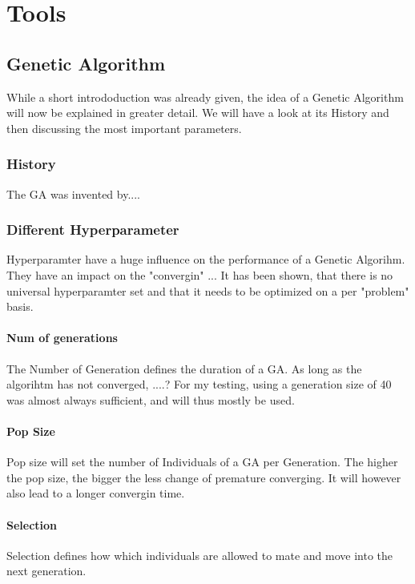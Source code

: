 \chapter{Tools}
\section{Genetic Algorithm}

While a short intrododuction was already given, the idea of a Genetic Algorithm will now be explained in greater detail.
We will have a look at its History and then discussing the most important parameters.


\subsection{History}
The GA was invented by....


\subsection{Different Hyperparameter}
Hyperparamter have a huge influence on the performance of a Genetic Algorihm. They have an impact on the "convergin" ...
It has been shown, that there is no universal hyperparamter set and that it needs to be optimized on a per "problem" basis.

\subsubsection{Num of generations}
The Number of Generation defines the duration of a GA. As long as the algorihtm has not converged, ....?
For my testing, using a generation size of 40 was almost always sufficient, and will thus mostly be used.

\subsubsection{Pop Size}
Pop size will set the number of Individuals of a GA per Generation. The higher the pop size, the bigger the less change of premature converging. 
It will however also lead to a longer convergin time.

\subsubsection{Selection}
Selection defines how which individuals are allowed to mate and move into the next generation.

